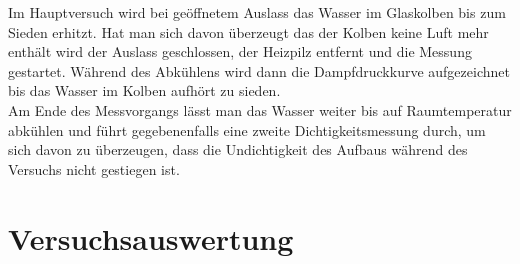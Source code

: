 \documentclass[12pt,a4paper]{article}
\begin{document}
Im Hauptversuch wird bei geöffnetem Auslass das Wasser im Glaskolben bis zum Sieden erhitzt. Hat man sich davon überzeugt das der Kolben keine Luft mehr enthält wird der Auslass geschlossen, der Heizpilz entfernt und die Messung gestartet. Während des Abkühlens wird dann die Dampfdruckkurve aufgezeichnet bis das Wasser im Kolben aufhört zu sieden.\\
Am Ende des Messvorgangs lässt man das Wasser weiter bis auf Raumtemperatur abkühlen und führt gegebenenfalls eine zweite Dichtigkeitsmessung durch, um sich davon zu überzeugen, dass die Undichtigkeit des Aufbaus während des Versuchs nicht gestiegen ist. 

\section{Versuchsauswertung}
\end{document}
